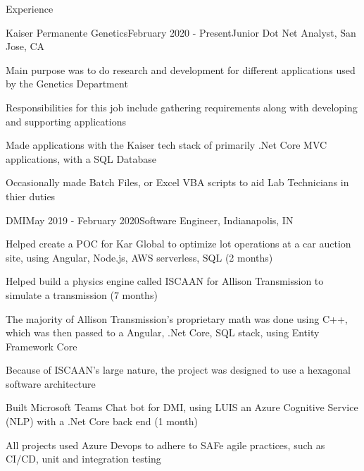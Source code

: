 \documentclass{resume} %
\begin{document}
\begin{rSection}{Experience}
\begin{rSubsection}{Kaiser Permanente Genetics}{February 2020 - Present}{Junior Dot Net Analyst, San Jose, CA}

\item Main purpose was to do research and development for different applications used by the Genetics Department
\item Responsibilities for this job include gathering requirements along with developing and supporting applications
\item Made applications with the Kaiser tech stack of primarily .Net Core MVC applications, with a SQL Database
\item Occasionally made Batch Files, or Excel VBA scripts to aid Lab Technicians in thier duties
\end{rSubsection}
\begin{rSubsection}{DMI}{May 2019 - February 2020}{Software Engineer, Indianapolis, IN}

\item Helped create a POC for Kar Global to optimize lot operations at a car auction site, using Angular, Node.js, AWS serverless, SQL (2 months)
\item Helped build a physics engine called ISCAAN for Allison Transmission to simulate a transmission (7 months)
\item The majority of Allison Transmission's proprietary math was done using C++, which was then passed to a Angular, .Net Core, SQL stack, using Entity Framework Core 
\item Because of ISCAAN's large nature, the project was designed to use a hexagonal software architecture
\item Built Microsoft Teams Chat bot for DMI, using LUIS an Azure Cognitive Service (NLP) with a .Net Core back end (1 month)
\item All projects used Azure Devops to adhere to SAFe agile practices, such as CI/CD, unit and integration testing
\end{rSubsection}

\end{rSection}

\end{document}

